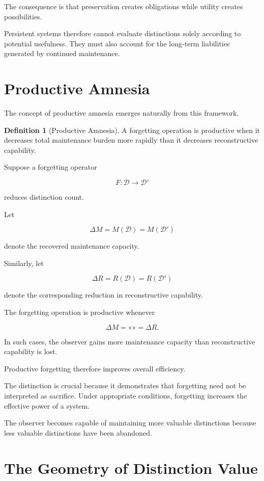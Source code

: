 \documentclass[12pt,oneside]{book}
\theoremstyle{plain} \newtheorem{theorem}{Theorem}[chapter] \newtheorem{lemma}[theorem]{Lemma} \newtheorem{proposition}[theorem]{Proposition} \newtheorem{corollary}[theorem]{Corollary}
\theoremstyle{definition} \newtheorem{definition}[theorem]{Definition} \newtheorem{axiom}[theorem]{Axiom} \newtheorem{construction}[theorem]{Construction}
\theoremstyle{remark} \newtheorem{remark}[theorem]{Remark} \newtheorem{example}[theorem]{Example}
\newcommand{\D}{\mathcal{D}} \newcommand{\R}{\mathcal{R}} \newcommand{\F}{\mathcal{F}} \newcommand{\U}{\mathcal{U}} \newcommand{\M}{\mathcal{M}} \newcommand{\G}{\Gamma}
\begin{document}
The consequence is that preservation creates obligations while utility creates possibilities.

Persistent systems therefore cannot evaluate distinctions solely according to potential usefulness. They must also account for the long-term liabilities generated by continued maintenance.

\section{Productive Amnesia}

The concept of productive amnesia emerges naturally from this framework.

\begin{definition}[Productive Amnesia]

A forgetting operation is productive when it decreases total maintenance burden more rapidly than it decreases reconstructive capability.

\end{definition}

Suppose a forgetting operator

\[
F
:
\D
\rightarrow
\D'
\]

reduces distinction count.

Let

\[
\Delta M
=
M(\D)
=
M(\D')
\]

denote the recovered maintenance capacity.

Similarly, let

\[
\Delta R
=
R(\D)
=
R(\D')
\]

denote the corresponding reduction in reconstructive capability.

The forgetting operation is productive whenever

\[
\Delta M
=
«»
=
\Delta R.
\]

In such cases, the observer gains more maintenance capacity than reconstructive capability is lost.

Productive forgetting therefore improves overall efficiency.

The distinction is crucial because it demonstrates that forgetting need not be interpreted as sacrifice. Under appropriate conditions, forgetting increases the effective power of a system.

The observer becomes capable of maintaining more valuable distinctions because less valuable distinctions have been abandoned.

\section{The Geometry of Distinction Value}
\end{document}
